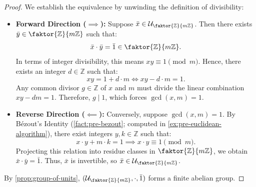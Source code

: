 \begin{content}

\begin{proof}
We establish the equivalence by unwinding the definition of divisibility:
\begin{itemize}
    \item \textbf{Forward Direction ($\implies$):} Suppose $\bar{x} \in \mathcal{U}_{\faktor{\mathbb{Z}}{m\mathbb{Z}}}$. Then there exists $\bar{y} \in \faktor{\mathbb{Z}}{m\mathbb{Z}}$ such that:
    \[
    \bar{x} \cdot \bar{y} = \bar{1} \in \faktor{\mathbb{Z}}{m\mathbb{Z}}.
    \]
    In terms of integer divisibility, this means $x y \equiv 1 \pmod m$. Hence, there exists an integer $d \in \mathbb{Z}$ such that:
    \[
    x y = 1 + d \cdot m \iff x y - d \cdot m = 1.
    \]
    Any common divisor $g \in \mathbb{Z}$ of $x$ and $m$ must divide the linear combination $x y - d m = 1$. Therefore, $g \mid 1$, which forces $\operatorname{gcd}(x, m) = 1$.
    \item \textbf{Reverse Direction ($\impliedby$):} Conversely, suppose $\operatorname{gcd}(x, m) = 1$. By Bézout's Identity (\cref{fact:pre-bezout}; computed in \cref{ex:pre-euclidean-algorithm}), there exist integers $y, k \in \mathbb{Z}$ such that:
    \[
    x \cdot y + m \cdot k = 1 \implies x \cdot y \equiv 1 \pmod m.
    \]
    Projecting this relation into residue classes in $\faktor{\mathbb{Z}}{m\mathbb{Z}}$, we obtain $\bar{x} \cdot \bar{y} = \bar{1}$. Thus, $\bar{x}$ is invertible, so $\bar{x} \in \mathcal{U}_{\faktor{\mathbb{Z}}{m\mathbb{Z}}}$.
\end{itemize}
By \cref{prop:group-of-units}, $(\mathcal{U}_{\faktor{\mathbb{Z}}{m\mathbb{Z}}}, \cdot, \bar{1})$ forms a finite abelian group.
\end{proof}
\end{content}


